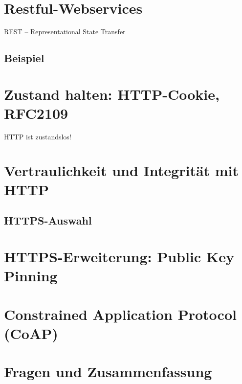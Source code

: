 \section{Restful-Webservices}
REST -- Representational State Transfer
\subsection*{Beispiel}
\section{Zustand halten: HTTP-Cookie, RFC2109}
HTTP ist zustandslos!
\section{Vertraulichkeit und Integrität mit HTTP}
\subsection{HTTPS-Auswahl}
\section{HTTPS-Erweiterung: Public Key Pinning}
\section{Constrained Application Protocol (CoAP)}
\section{Fragen und Zusammenfassung}
